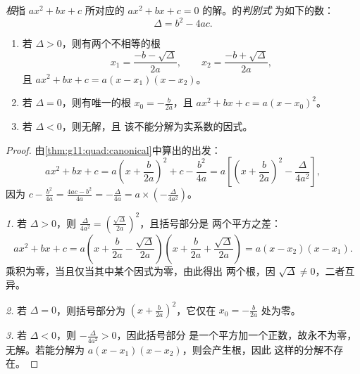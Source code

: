 \begin{definition}[根、判别式]\label{def:g11:quad:discriminant}
\emph{根}指 $ax^2+bx+c$ 所对应的
 $ax^2 + bx + c = 0$ 的解。的\emph{判别式}
为如下的数：
\[
\Delta = b^2 - 4ac .
\]
\end{definition}

\begin{theorem}[解方程 $ax^2+bx+c=0$]\label{thm:g11:quad:roots}
\begin{enumerate}
  \item 若 $\Delta > 0$，则有两个不相等的根
        \[
        x_1 = \frac{-b - \sqrt{\Delta}}{2a},
        \qquad
        x_2 = \frac{-b + \sqrt{\Delta}}{2a},
        \]
        且 $ax^2+bx+c = a(x - x_1)(x - x_2)$。
  \item 若 $\Delta = 0$，则有唯一的根
        $x_0 = -\frac{b}{2a}$，且 $ax^2+bx+c = a(x - x_0)^2$。
  \item 若 $\Delta < 0$，则无解，且
        该不能分解为实系数的因式。
\end{enumerate}
\end{theorem}

\begin{proof}
由\cref{thm:g11:quad:canonical}中算出的出发：
\[
ax^2+bx+c
= a\left(x + \frac{b}{2a}\right)^2 + c - \frac{b^2}{4a}
= a\left[\left(x + \frac{b}{2a}\right)^2 - \frac{\Delta}{4a^2}\right],
\]
因为 $c - \frac{b^2}{4a} = \frac{4ac - b^2}{4a} = -\frac{\Delta}{4a} =
a \times \left(-\frac{\Delta}{4a^2}\right)$。

\emph{1.} 若 $\Delta > 0$，则 $\frac{\Delta}{4a^2} =
\left(\frac{\sqrt\Delta}{2a}\right)^2$，且括号部分是
两个平方之差：
\[
ax^2+bx+c = a\left(x + \frac{b}{2a} - \frac{\sqrt\Delta}{2a}\right)
\left(x + \frac{b}{2a} + \frac{\sqrt\Delta}{2a}\right)
= a(x - x_2)(x - x_1).
\]
乘积为零，当且仅当其中某个因式为零，由此得出
两个根，因 $\sqrt\Delta \neq 0$，二者互异。

\emph{2.} 若 $\Delta = 0$，则括号部分为
$\left(x + \frac{b}{2a}\right)^2$，它仅在
$x_0 = -\frac{b}{2a}$ 处为零。

\emph{3.} 若 $\Delta < 0$，则 $-\frac{\Delta}{4a^2} > 0$，因此括号部分
是一个平方加一个正数，故永不为零，
无解。若能分解为 $a(x-x_1)(x-x_2)$，则会产生根，因此
这样的分解不存在。
\end{proof}

